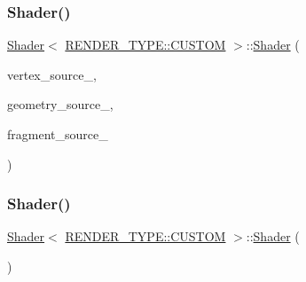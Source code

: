\subsubsection{\texorpdfstring{Shader()}{Shader()}\hspace{0.1cm}{\footnotesize\ttfamily [1/3]}}
{\footnotesize\ttfamily \mbox{\hyperlink{classShader}{Shader}}$<$ \mbox{\hyperlink{shader__class_8hpp_a24e288e18eb7b6e01de7565001fedb60a72baef04098f035e8a320b03ad197818}{R\+E\+N\+D\+E\+R\+\_\+\+T\+Y\+P\+E\+::\+C\+U\+S\+T\+OM}} $>$\+::\mbox{\hyperlink{classShader}{Shader}} (\begin{DoxyParamCaption}\item[{const \mbox{\hyperlink{glad_8h_ac83513893df92266f79a515488701770}{std\+::string}} \&}]{vertex\+\_\+source\+\_\+,  }\item[{const \mbox{\hyperlink{glad_8h_ac83513893df92266f79a515488701770}{std\+::string}} \&}]{geometry\+\_\+source\+\_\+,  }\item[{const \mbox{\hyperlink{glad_8h_ac83513893df92266f79a515488701770}{std\+::string}} \&}]{fragment\+\_\+source\+\_\+ }\end{DoxyParamCaption})\hspace{0.3cm}{\ttfamily [inline]}}

\mbox{\label{classShader_3_01RENDER__TYPE_1_1CUSTOM_01_4_a4fea53201befd8962702645fe8f2526e}} 
\subsubsection{\texorpdfstring{Shader()}{Shader()}\hspace{0.1cm}{\footnotesize\ttfamily [2/3]}}
{\footnotesize\ttfamily \mbox{\hyperlink{classShader}{Shader}}$<$ \mbox{\hyperlink{shader__class_8hpp_a24e288e18eb7b6e01de7565001fedb60a72baef04098f035e8a320b03ad197818}{R\+E\+N\+D\+E\+R\+\_\+\+T\+Y\+P\+E\+::\+C\+U\+S\+T\+OM}} $>$\+::\mbox{\hyperlink{classShader}{Shader}} (\begin{DoxyParamCaption}\item[{\mbox{\hyperlink{classShader}{Shader}}$<$ \mbox{\hyperlink{shader__class_8hpp_a24e288e18eb7b6e01de7565001fedb60a72baef04098f035e8a320b03ad197818}{R\+E\+N\+D\+E\+R\+\_\+\+T\+Y\+P\+E\+::\+C\+U\+S\+T\+OM}} $>$ \&\&}]{ }\end{DoxyParamCaption})\hspace{0.3cm}{\ttfamily [delete]}}


